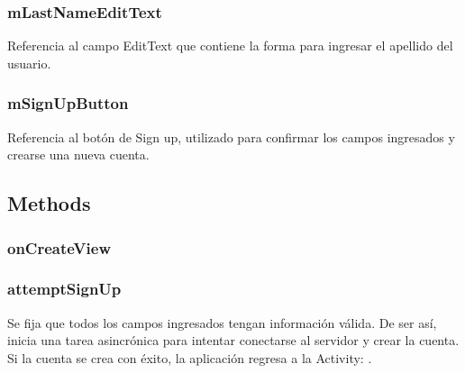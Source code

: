 \documentclass[letterpaper,10pt,english]{sphinxmanual}
\begin{document}
\subsubsection{mLastNameEditText}
\label{Fragments/SignUpFragment:mlastnameedittext}

\begin{fulllineitems}
\label{Fragments/SignUpFragment:com.fiuba.tallerii.jobify.SignUpFragment.mLastNameEditText}
Referencia al campo EditText que contiene la forma para ingresar el apellido del usuario.

\end{fulllineitems}



\subsubsection{mSignUpButton}
\label{Fragments/SignUpFragment:msignupbutton}

\begin{fulllineitems}
\label{Fragments/SignUpFragment:com.fiuba.tallerii.jobify.SignUpFragment.mSignUpButton}
Referencia al botón de Sign up, utilizado para confirmar los campos ingresados y crearse una nueva cuenta.

\end{fulllineitems}



\subsection{Methods}
\label{Fragments/SignUpFragment:methods}

\subsubsection{onCreateView}
\label{Fragments/SignUpFragment:oncreateview}

\subsubsection{attemptSignUp}
\label{Fragments/SignUpFragment:attemptsignup}

\begin{fulllineitems}
\label{Fragments/SignUpFragment:com.fiuba.tallerii.jobify.SignUpFragment.attemptSignUp()}
Se fija que todos los campos ingresados tengan información válida. De ser así, inicia una tarea asincrónica para intentar conectarse al servidor y crear la cuenta. Si la cuenta se crea con éxito, la aplicación regresa a la Activity: .

\end{fulllineitems}
\end{document}
